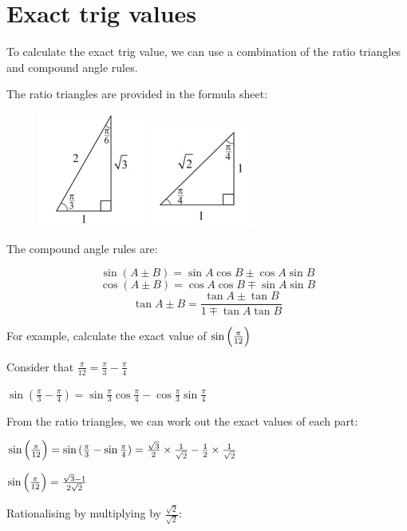 \documentclass[../main.tex]{subfiles}
\begin{document}
\section{Exact trig values}
To calculate the exact trig value, we can use a combination of the ratio triangles and compound angle rules.

The ratio triangles are provided in the formula sheet:

\begin{figure}[h]
    \centering
    \includegraphics{images/ratiotriangle1.png}
    \includegraphics{images/ratiotriangle2.png}
\end{figure}

The compound angle rules are:

\[\sin{(A\pm B)}=\sin{A}\cos{B}\pm \cos{A}\sin{B}\]
\[\cos{(A\pm B)}=\cos{A}\cos{B}\mp \sin{A}\sin{B}\]
\[\tan{A\pm B}=\frac{\tan{A}\pm \tan{B}}{1 \mp \tan{A}\tan{B}}\]

For example, calculate the exact value of $\sin{\Bigl(\frac{\pi}{12}\Bigr)}$

Consider that $\frac{\pi}{12}=\frac{\pi}{3}-\frac{\pi}{4}$

$\sin{(\frac{\pi}{3}-\frac{\pi}{4})}=\sin{\frac{\pi}{3}}\cos{\frac{\pi}{4}}-\cos{\frac{\pi}{3}}\sin{\frac{\pi}{4}}$

From the ratio triangles, we can work out the exact values of each part:

$\sin{\Bigl(\frac{\pi}{12}\Bigr)}=\sin{(\frac{\pi}{3}-\sin{\frac{\pi}{4}})}=\frac{\sqrt{3}}{2}\times \frac{1}{\sqrt{2}}-\frac{1}{2}\times \frac{1}{\sqrt{2}}$

$\sin{\Bigl(\frac{\pi}{12}\Bigr)}=\frac{\sqrt{3}-1}{2\sqrt{2}}$

Rationalising by multiplying by $\frac{\sqrt{2}}{\sqrt{2}}$:
\end{document}
